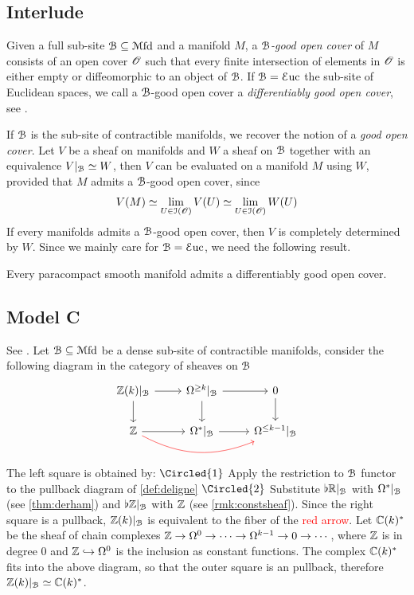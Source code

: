 \documentclass[10pt]{amsart}
\begin{document}
\subsection{Interlude}\label{int:goodcover}
\begin{definition}
  Given a full sub-site $\mathcal{B}\subseteq\mathcal{M}\mathrm{fd}$ and a manifold $M$, a $\mathcal{B}$\emph{-good open cover} of $M$ consists of an open cover $\mathscr{O}$ such that every finite intersection of elements in $\mathscr{O}$ is either empty or diffeomorphic to an object of $\mathcal{B}$. If $\mathcal{B}=\mathcal{E}\mathrm{uc}$ the sub-site of Euclidean spaces, we call a $\mathcal{B}$-good open cover a \emph{differentiably good open cover}, see \cite[Definition 6.3.9]{fiorenza2011cechcocyclesdifferentialcharacteristic}.
\end{definition}If $\mathcal{B}$ is the sub-site of contractible manifolds, we recover the notion of a \emph{good open cover}. Let $V$ be a sheaf on manifolds and $W$ a sheaf on $\mathcal{B}$ together with an equivalence $V|_{\mathcal{B}}\simeq W$, then $V$ can be evaluated on a manifold $M$ using $W$, provided that $M$ admits a $\mathcal{B}$-good open cover, since \[V(M)\simeq\lim_{U\in\mathcal{I}(\mathscr{O})}V(U)\simeq\lim_{U\in\mathcal{I}(\mathscr{O})}W(U)\]
If every manifolds admits a $\mathcal{B}$-good open cover, then $V$ is completely determined by $W$. Since we mainly care for $\mathcal{B}=\mathcal{E}\mathrm{uc}$, we need the following result. 
\begin{theorem}
  Every paracompact smooth manifold admits a differentiably good open cover. 
\end{theorem}
\subsection{Model C}\label{mod:C} See {\cite[Lemma 7.3.4]{amabeldebrayhaine2021diffcoh}}. Let $\mathcal{B}\subseteq\mathcal{M}\mathrm{fd}$ be a dense sub-site of contractible manifolds, consider the following diagram in the category of {sheaves} on $\mathcal{B}$
\[\begin{tikzcd}
     {\bZ}(k)|_\lB\arrow[d]\arrow[r] & \Omega^{\geq k}|_\lB\arrow[d] \arrow[r] & 0\arrow[d] \\
    \bZ \arrow[r]\arrow[rr,bend right=2.5em,color=red] & \Omega^*|_\lB\arrow[r] & \Omega^{\leq k-1}|_\lB
\end{tikzcd}\] The left square is obtained by: $\Circled{1}$ Apply the restriction to $\mathcal{B}$ functor to the pullback diagram of \cref{def:deligne} $\Circled{2}$ Substitute $\flat\mathbb{R}|_{\mathcal{B}}$ with $\Omega^*|_{\mathcal{B}}$ (see \cref{thm:derham}) and $\flat\mathbb{Z}|_{\mathcal{B}}$ with $\mathbb{Z}$ (see \cref{rmk:constsheaf}). Since the right square is a pullback, ${\mathbb{Z}}(k)|_{\mathcal{B}}$ is equivalent to the fiber of the \textcolor{red}{red arrow}. Let $\mathbb{C}(k)^*$ be the sheaf of chain complexes $\mathbb{Z}\to\Omega^0\to\cdots\to\Omega^{k-1}\to0\to\cdots$, where $\mathbb{Z}$ is in degree 0 and $\mathbb{Z}\hookrightarrow\Omega^0$ is the inclusion as constant functions. The complex $\mathbb{C}(k)^*$ fits into the above diagram, so that the outer square is an pullback, therefore ${\mathbb{Z}}(k)|_{\mathcal{B}}\simeq\mathbb{C}(k)^*$. 
\end{document}
